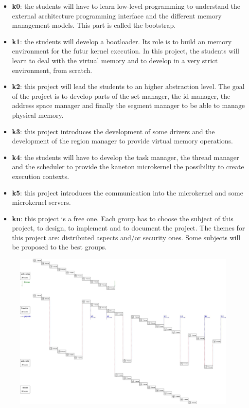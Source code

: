 \begin{multicols}{2}
\begin{itemize}
  \item
    \textbf{k0}: the students will have to learn low-level programming to
    understand the external architecture programming interface and the
    different memory management models. This part is called the bootstrap.
  \item
    \textbf{k1}: the students will develop a bootloader. Its role is to
    build an memory environment for the futur kernel execution. In this
    project, the students will learn to deal with the virtual memory
    and to develop in a very strict environment, from scratch.
  \item
    \textbf{k2}: this project will lead the students to an higher abstraction
    level. The goal of the project is to develop parts of the set manager,
    the id manager, the address space manager and finally the segment
    manager to be able to manage physical memory.
  \item
    \textbf{k3}: this project introduces the development of some drivers
    and the development of the region manager to provide virtual memory
    operations.
  \item
    \textbf{k4}: the students will have to develop the task manager, the
    thread manager and the scheduler to provide the kaneton microkernel
    the possibility to create execution contexts.
  \item
    \textbf{k5}: this project introduces the communication into the
    microkernel and some microkernel servers.
  \item
    \textbf{kn}: this project is a free one. Each group has to choose the
    subject of this project, to design, to implement and to document
    the project. The themes for this project are: distributed aspects and/or
    security ones. Some subjects will be proposed to the best groups.
\end{itemize}

\end{multicols}

\begin{figure}[h]
\centerline{\includegraphics[angle=-90,scale=0.3]{figures/schedule.jpg}}
\end{figure}

